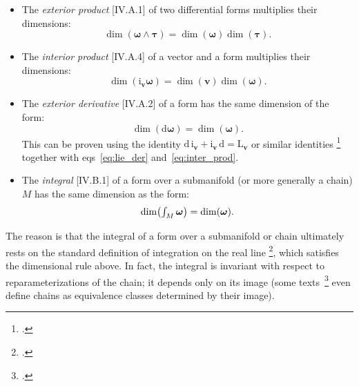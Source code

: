 \documentclass[\ifafour a4paper,12pt,\else a5paper,10pt,\fi%
onecolumn,oneside,article,%
british%
]{memoir}
\theoremstyle{remark}
\theoremstyle{innote}
\newcommand*{\citep}{\footcites}
\newcommand*{\di}{\mathrm{d}}%
\renewcommand*{\|}[1][]{\nonscript\,#1\vert\nonscript\;\mathopen{}}
\newcommand*{\sect}{\S}%
\newcommand*{\sects}{\S\S}%
\newcommand*{\chap}{ch.}%
\newcommand*{\eqns}{eqs}%
\newcommand*{\eg}{{e.g.}}
\newcommand*{\tint}{\begingroup\textstyle\int\endgroup\nolimits}
\newcommand*{\Li}{\mathrm{L}}
\newcommand*{\ii}{\mathrm{i}}
\newcommand*{\yom}{\bm{\omega}}
\newcommand*{\yta}{\bm{\tau}}
\newcommand*{\yv}{\bm{v}}
\begin{document}
\begin{itemize}[wide=0pt]
\item The \emph{exterior product} [IV.A.1] of two differential forms
  multiplies their dimensions:
  \begin{equation}
  \dim(\yom\land\yta) = \dim(\yom)\dim(\yta).\label{eq:ext_prod}
\end{equation}
  
\item The \emph{interior product} [IV.A.4] of a vector and a form
  multiplies their dimensions:
  \begin{equation}
    \dim(\ii_{\yv}\yom) =\dim(\yv)\dim(\yom).
    \label{eq:inter_prod}
\end{equation}

\item The \emph{exterior derivative} [IV.A.2] of a form has the same
  dimension of the form:
  \begin{equation}
    \dim(\di\yom) =\dim(\yom).
    \label{eq:ext_deriv}
  \end{equation}
  This can be proven using the identity
  $\di\,\ii_{\yv}+\ii_{\yv}\,\di = \Li_{\yv}$ or similar identities
  \citep[\chap~9 p.~180 Theorem~9.78]{curtisetal1985}[\sect~6.4
  Theorem~6.4.8]{abrahametal1983_r1988} together with
  \eqns~\eqref{eq:lie_der} and~\eqref{eq:inter_prod}.

\item The \emph{integral} [IV.B.1] of a form over a submanifold (or more
  generally a chain) $M$ has the same dimension as the form:
  \begin{equation}
    \dim\bigl(\tint_{M}\yom\bigr) =\dim(\yom).
    \label{eq:integration}
  \end{equation}
\end{itemize}
The reason is that the integral of a form over a submanifold or chain
ultimately rests on the standard definition of integration on the real line
\citep[\eg][\sects~IV.B.1--2]{choquetbruhatetal1977_r1996}[\sect~5 p.~21,
\sect~6
p.~24]{derham1955_t1984}[\sect~7.1]{abrahametal1983_r1988}[\sect~VI.2]{boothby1975_r2003},
which satisfies the dimensional rule above. In fact, the integral is
invariant with respect to reparameterizations of the chain; it depends only
on its image (some texts~\citep[\eg][\sect~10.4
p.~297]{martin1991_r2004}[\sect~7.3]{fecko2006} even define chains as
equivalence classes determined by their image).

\medskip

\end{document}
